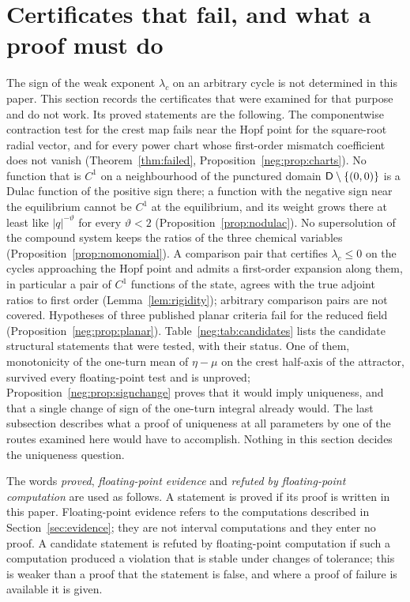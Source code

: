 \section{Certificates that fail, and what a proof must do}\label{sec:negative}
The sign of the weak exponent $\lambda_c$ on an arbitrary cycle is not determined in this paper. This section records the certificates that were examined for that purpose and do not work. Its proved statements are the following. The componentwise contraction test for the crest map fails near the Hopf point for the square-root radial vector, and for every power chart whose first-order mismatch coefficient does not vanish (Theorem~\ref{thm:failed}, Proposition~\ref{neg:prop:charts}). No function that is $C^1$ on a neighbourhood of the punctured domain $\mathsf D\setminus\{(0,0)\}$ is a Dulac function of the positive sign there; a function with the negative sign near the equilibrium cannot be $C^1$ at the equilibrium, and its weight grows there at least like $|q|^{-\vartheta}$ for every $\vartheta<2$ (Proposition~\ref{prop:nodulac}). No supersolution of the compound system keeps the ratios of the three chemical variables (Proposition~\ref{prop:nomonomial}). A comparison pair that certifies $\lambda_c\le0$ on the cycles approaching the Hopf point and admits a first-order expansion along them, in particular a pair of $C^1$ functions of the state, agrees with the true adjoint ratios to first order (Lemma~\ref{lem:rigidity}); arbitrary comparison pairs are not covered. Hypotheses of three published planar criteria fail for the reduced field (Proposition~\ref{neg:prop:planar}). Table~\ref{neg:tab:candidates} lists the candidate structural statements that were tested, with their status. One of them, monotonicity of the one-turn mean of $\eta-\mu$ on the crest half-axis of the attractor, survived every floating-point test and is unproved; Proposition~\ref{neg:prop:signchange} proves that it would imply uniqueness, and that a single change of sign of the one-turn integral already would. The last subsection describes what a proof of uniqueness at all parameters by one of the routes examined here would have to accomplish. Nothing in this section decides the uniqueness question.

The words \emph{proved}, \emph{floating-point evidence} and \emph{refuted by floating-point computation} are used as follows. A statement is proved if its proof is written in this paper. Floating-point evidence refers to the computations described in Section~\ref{sec:evidence}; they are not interval computations and they enter no proof. A candidate statement is refuted by floating-point computation if such a computation produced a violation that is stable under changes of tolerance; this is weaker than a proof that the statement is false, and where a proof of failure is available it is given.

